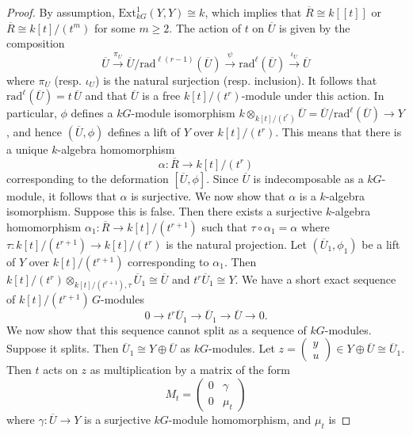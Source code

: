 \documentclass{amsart}
\theoremstyle{plain}
\theoremstyle{definition}
\theoremstyle{remark}
\begin{document}
\begin{proof}
By assumption, $\mathrm{Ext}^1_{kG}(Y,Y)\cong k$, which implies that $\overline{R}\cong k[[t]]$ or
$\overline{R}\cong k[t]/(t^m)$ for some $m\ge 2$. 
The action of $t$ on $\overline{U}$ is given by the composition
$$\overline{U} \xrightarrow{\pi_U} \overline{U}/\mathrm{rad}^{\ell(r-1)} (\overline{U}) 
\xrightarrow{\psi} \mathrm{rad}^{\ell} (\overline{U})\xrightarrow{\iota_U}\overline{U}$$
where $\pi_U$ (resp. $\iota_U$) is the natural surjection (resp. inclusion).
It follows that $\mathrm{rad}^{\ell} (\overline{U})=t \,\overline{U}$ and that
$\overline{U}$ is a free $k[t]/(t^r)$-module under this action. In particular, $\phi$ defines a 
$kG$-module isomorphism $k\otimes_{k[t]/(t^r)}\overline{U}=\overline{U} /\mathrm{rad}^{\ell} 
(\overline{U})\to  Y$, and hence $(\overline{U},\phi)$ defines a lift of $Y$ over $k[t]/(t^r)$.
This means that there is a unique $k$-algebra homomorphism
$$\alpha:\overline{R}\to k[t]/(t^{r})$$
corresponding to the deformation $[\overline{U},\phi]$. Since $\overline{U}$ is indecomposable as a 
$kG$-module, it follows that $\alpha$ is surjective. We now show that $\alpha$ is a $k$-algebra 
isomorphism. Suppose this is false. Then there exists a surjective $k$-algebra homomorphism 
$\alpha_1:\overline{R}\to k[t]/(t^{r+1})$ such that $\tau\circ\alpha_1=\alpha$ where 
$\tau:k[t]/(t^{r+1})\to k[t]/(t^{r})$ is the natural projection. Let $(\overline{U}_1,\phi_1)$ be a lift of $Y$ over 
$k[t]/(t^{r+1})$ corresponding to $\alpha_1$. Then $k[t]/(t^r)\otimes_{k[t]/(t^{r+1}),\tau}\overline{U}_1
\cong \overline{U}$ and $t^{r}\overline{U}_1\cong Y$. We have a short 
exact sequence of $k[t]/(t^{r+1})\,G$-modules
\begin{equation}
\label{eq:thesos}
0\to t^{r}\overline{U}_1\to \overline{U}_1\to \overline{U}\to 0.
\end{equation}
We now show that this sequence cannot split as a sequence of $kG$-modules. Suppose it splits. Then 
$\overline{U}_1\cong Y\oplus \overline{U}$ as $kG$-modules. Let 
$z=\left(\begin{array}{c}y\\u\end{array}\right)\in Y\oplus \overline{U} \cong \overline{U}_1$. 
Then $t$ acts on $z$ as multiplication by a matrix of the form
$$M_t=\left(\begin{array}{cc}0&\gamma\\0&\mu_t\end{array}\right)$$ 
where $\gamma:\overline{U}\to Y$ is a surjective $kG$-module homomorphism, and $\mu_t$ is 

\end{proof}
\end{document}
